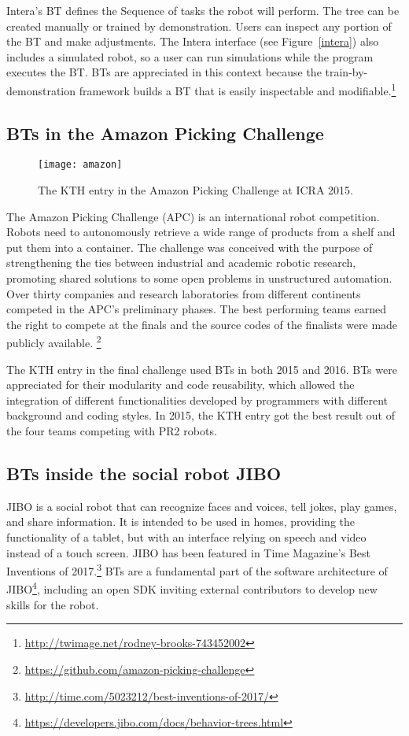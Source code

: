 Intera's BT defines the Sequence of tasks the robot will perform. The tree can be created manually or trained by demonstration. Users can inspect any portion of the BT and make adjustments. The Intera interface (see Figure~\ref{intera}) also includes a simulated robot, so a user can run simulations while  the program executes the BT. BTs are appreciated in this context because the train-by-demonstration framework builds a BT that is easily inspectable and modifiable.\footnote{\url{http://twimage.net/rodney-brooks-743452002}}



\subsection{BTs in the Amazon Picking Challenge}

\begin{figure}[h!]
\centering
  \texttt{[image: amazon]}
  \caption{The KTH entry in the Amazon Picking Challenge at ICRA 2015.}
  \label{amazon}
\end{figure}

The Amazon Picking Challenge (APC) is an international robot competition. Robots need to autonomously retrieve a wide range of products from a shelf and put them into a container. The challenge was conceived with the purpose of strengthening the ties between  industrial and academic robotic research, promoting shared solutions to some open problems in unstructured automation. Over thirty companies and research laboratories from different continents competed in the APC's preliminary phases. The best performing teams earned the right to compete at the finals and the source codes of the finalists were made publicly available. \footnote{\url{https://github.com/amazon-picking-challenge}}

The KTH entry in the final challenge used BTs in both  2015 and 2016. BTs were appreciated for their modularity and code reusability, which allowed the integration of different functionalities developed by programmers with different background and coding styles. In  2015, the KTH entry got the best result out of the four teams competing with PR2 robots.

\subsection{BTs inside the social robot JIBO}
JIBO is a social robot that can recognize faces and voices, tell jokes, play games, and share information.
It is intended to be used in homes, providing the functionality of a tablet, but with an interface relying on speech and video instead of a touch screen. JIBO has been featured in Time Magazine's Best Inventions of 2017.\footnote{\url{http://time.com/5023212/best-inventions-of-2017/}} BTs are a fundamental part of the software architecture of JIBO\footnote{\url{https://developers.jibo.com/docs/behavior-trees.html}},
including an open SDK inviting external contributors to develop new skills for the robot.

